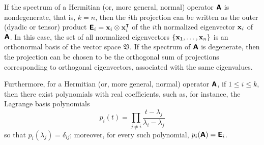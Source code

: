 If the spectrum of a  Hermitian (or, more general, normal) operator $\textsf{\textbf{A}}$ is nondegenerate, that is, $k=n$, then the
$i$th projection
can be written as the outer (dyadic or tensor) product
$
\textsf{\textbf{E}}_i={\bf x}_i \otimes {\bf x}_i^\intercal $
of the $i$th normalized eigenvector ${\bf x}_i $ of $\textsf{\textbf{A}}$.
In this case, the set of all normalized eigenvectors $\{{\bf x}_1, \ldots ,{\bf x}_n\}$ is an orthonormal basis of the vector space $\frak V$.
If the spectrum of $\textsf{\textbf{A}}$ is degenerate, then the projection can be chosen to be the orthogonal sum of projections
corresponding to orthogonal eigenvectors, associated with the same eigenvalues.

Furthermore, for a  Hermitian (or, more general, normal) operator $\textsf{\textbf{A}}$,
if $1\le i \le k$,
then there exist polynomials with real coefficients, such as,  for instance, the
Lagrange basis polynomials
\begin{equation}
p_i  (t)
=
\prod_{j\neq i}
\frac{t-\lambda_j}{\lambda_i -\lambda_j}
\label{2011-m-epsf}
\end{equation}
so that
$p_i(\lambda_j) =\delta_{ij}$;
moreover, for every such polynomial,
$p_i(\textsf{\textbf{A}})=\textsf{\textbf{E}}_i$.

